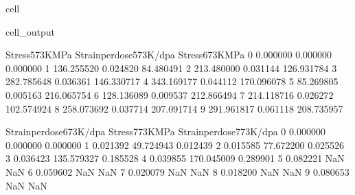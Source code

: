 \documentclass[letterpaper,10pt,english]{jupyterBook}
\begin{document}
\begin{sphinxuseclass}{cell}
\begin{sphinxVerbatimOutput}
			\begin{sphinxuseclass}{cell_output}
				\begin{sphinxVerbatim}[commandchars=\\\{\}]
					Stress\PYGZus{}573KMPa  Strainperdose\PYGZus{}573K\PYGZpc{}/dpa  Stress\PYGZus{}673KMPa  \PYGZbs{}
					0        0.000000                 0.000000        0.000000   
					1      136.255520                 0.024820       84.480491   
					2      213.480000                 0.031144      126.931784   
					3      282.785648                 0.036361      146.330717   
					4      343.169177                 0.044112      170.096078   
					5       85.269805                 0.005163      216.065754   
					6      128.136089                 0.009537      212.866494   
					7      214.118716                 0.026272      102.574924   
					8      258.073692                 0.037714      207.091714   
					9      291.961817                 0.061118      208.735957   
					
					Strainperdose\PYGZus{}673K\PYGZpc{}/dpa  Stress\PYGZus{}773KMPa  Strainperdose\PYGZus{}773K\PYGZpc{}/dpa  
					0                 0.000000        0.000000                 0.000000  
					1                 0.021392       49.724943                 0.012439  
					2                 0.015585       77.672200                 0.025526  
					3                 0.036423      135.579327                 0.185528  
					4                 0.039855      170.045009                 0.289901  
					5                 0.082221             NaN                      NaN  
					6                 0.059602             NaN                      NaN  
					7                 0.020079             NaN                      NaN  
					8                 0.018200             NaN                      NaN  
					9                 0.080653             NaN                      NaN  
				\end{sphinxVerbatim}
				
				\noindent{}
				
		\end{sphinxuseclass}\end{sphinxVerbatimOutput}
		
	\end{sphinxuseclass}
	
\end{document}
